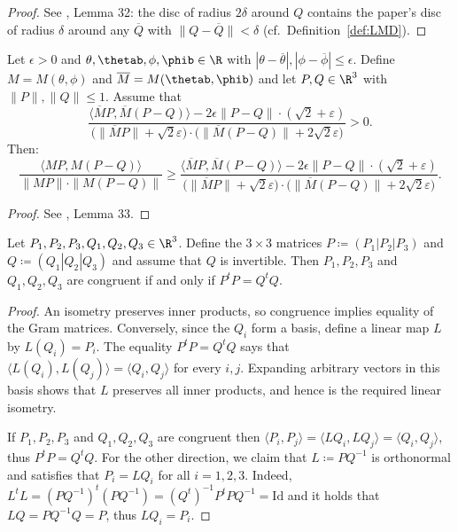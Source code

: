 \begin{proof}\leanok
See \cite{polyhedron.without.rupert}, Lemma 32: the disc of radius $2\delta$ around $Q$ contains the paper's disc of radius $\delta$ around any $\overline{Q}$ with $\|Q - \overline{Q}\| < \delta$ (cf.\ Definition~\ref{def:LMD}).
\end{proof}

\begin{lemma} \label{lem:coss}
  \leanok
  Let $\epsilon>0$ and $\theta,\thetab, \phi, \phib \in \R$ with $|\theta - \overline{\theta}|, |\phi - \overline{\phi}| \leq \epsilon$. Define $M = M(\theta, \phi)$ and $\overline{M} = M(\thetab, \phib)$ and let $P, Q \in \R^3$ with $\|P\|, \|Q\| \leq 1$. Assume that
    \[
        \frac{\langle \overline{M} P,\overline{M} (P-Q)\rangle - 2 \epsilon \|P-Q\| \cdot  (\sqrt{2}+\varepsilon)}{ \big(\|\overline{M} P\|+\sqrt{2} \varepsilon \big) \cdot \big(\|\overline{M}(P-Q)\|+2 \sqrt{2} \varepsilon\big)} > 0.
    \]
  Then:
    \[
        \frac{\langle {M} P,{M} (P-Q)\rangle}{\|{M} P\| \cdot \|{M}(P-Q)\|} \geq
        \frac{\langle \overline{M} P,\overline{M} (P-Q)\rangle - 2 \epsilon \|P-Q\| \cdot  (\sqrt{2}+\varepsilon)}{ \big(\|\overline{M} P\|+\sqrt{2} \varepsilon \big) \cdot \big(\|\overline{M}(P-Q)\|+2 \sqrt{2} \varepsilon\big)}.
    \]
\end{lemma}
\begin{proof}
\leanok
See \cite{polyhedron.without.rupert}, Lemma 33.
\end{proof}

\begin{lemma} \label{lem:congruent}
\leanok
{}
    Let $P_1,P_2,P_3, Q_1,Q_2,Q_3 \in \R^3$. Define the $3 \times 3$ matrices $P \coloneqq (P_1|P_2|P_3)$ and $Q \coloneqq (Q_1|Q_2|Q_3)$ and assume that $Q$ is invertible.
    Then $P_1, P_2, P_3$ and $Q_1, Q_2, Q_3$ are congruent if and only if $P^t P = Q^t Q$.
\end{lemma}

\begin{proof}
\leanok
An isometry preserves inner products, so congruence implies equality of the Gram matrices.
Conversely, since the $Q_i$ form a basis, define a linear map $L$ by $L(Q_i)=P_i$.
The equality $P^t P = Q^t Q$ says that
$\langle L(Q_i),L(Q_j)\rangle=\langle Q_i,Q_j\rangle$ for every $i,j$.
Expanding arbitrary vectors in this basis shows that $L$ preserves all inner products,
and hence is the required linear isometry.

    If $P_1, P_2, P_3$ and $Q_1, Q_2, Q_3$ are congruent then $\langle P_i,P_j\rangle = \langle LQ_i,LQ_j\rangle = \langle Q_i,Q_j\rangle$, thus $P^t P = Q^t Q$.
    For the other direction, we claim that $L \coloneqq PQ^{-1}$ is orthonormal and satisfies that $P_i = LQ_i$ for all $i=1,2,3$.
    Indeed,  $L^t L = (PQ^{-1})^t (PQ^{-1}) = (Q^t)^{-1} P^t P Q^{-1} = \mathrm{Id}$ and it holds that $LQ=PQ^{-1}Q=P$, thus $LQ_i = P_i$.
\end{proof}



